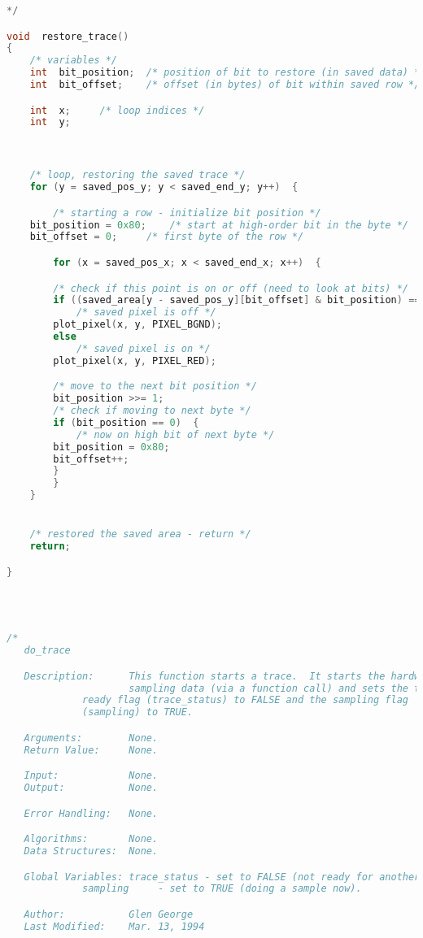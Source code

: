 \begin{lstlisting}[language=C]
*/

void  restore_trace()
{
    /* variables */
    int  bit_position;	/* position of bit to restore (in saved data) */
    int  bit_offset;    /* offset (in bytes) of bit within saved row */

    int  x;		/* loop indices */
    int  y;



    /* loop, restoring the saved trace */
    for (y = saved_pos_y; y < saved_end_y; y++)  {

        /* starting a row - initialize bit position */
	bit_position = 0x80;	/* start at high-order bit in the byte */
	bit_offset = 0;		/* first byte of the row */

        for (x = saved_pos_x; x < saved_end_x; x++)  {

	    /* check if this point is on or off (need to look at bits) */
	    if ((saved_area[y - saved_pos_y][bit_offset] & bit_position) == 0)
	        /* saved pixel is off */
		plot_pixel(x, y, PIXEL_BGND);
	    else
	        /* saved pixel is on */
		plot_pixel(x, y, PIXEL_RED);

	    /* move to the next bit position */
	    bit_position >>= 1;
	    /* check if moving to next byte */
	    if (bit_position == 0)  {
	        /* now on high bit of next byte */
		bit_position = 0x80;
		bit_offset++;
	    }
        }
    }


    /* restored the saved area - return */
    return;

}




/*
   do_trace

   Description:      This function starts a trace.  It starts the hardware
                     sampling data (via a function call) and sets the trace
		     ready flag (trace_status) to FALSE and the sampling flag
		     (sampling) to TRUE.

   Arguments:        None.
   Return Value:     None.

   Input:            None.
   Output:           None.

   Error Handling:   None.

   Algorithms:       None.
   Data Structures:  None.

   Global Variables: trace_status - set to FALSE (not ready for another trace).
   		     sampling     - set to TRUE (doing a sample now).

   Author:           Glen George
   Last Modified:    Mar. 13, 1994


\end{lstlisting}
